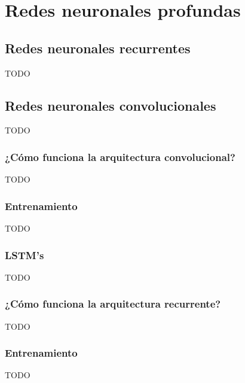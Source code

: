 \section{Redes neuronales profundas}



\subsection{Redes neuronales recurrentes}

TODO


\subsection{Redes neuronales convolucionales}

TODO


\subsubsection*{¿Cómo funciona la arquitectura convolucional?}

TODO


\subsubsection*{Entrenamiento}

TODO


\subsubsection*{LSTM's}

TODO


\subsubsection*{¿Cómo funciona la arquitectura recurrente?}

TODO


\subsubsection*{Entrenamiento}

TODO
